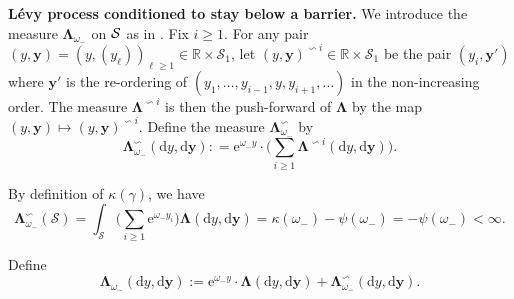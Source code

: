 \documentclass[12pt]{article}
\numberwithin{equation}{section}
\theoremstyle{plain}
\theoremstyle{definition}
\newcommand{\D}{\mathrm{d}}
\begin{document}
\noindent \textbf{L\'evy process conditioned to stay below a barrier. } We introduce the measure $\boldsymbol{\Lambda}_{\omega_-}$ on $\cal{S}$ as in \cite[Section 5.2]{BertoinJean2024SMta}. Fix $i\geq 1$. For any pair $(y, \boldsymbol{y}) = (y, (y_\ell))_{\ell\geq 1}\in\mathbb{R}\times \mathcal{S}_1$, let $(y, \boldsymbol{y})^{\backsim i} \in \mathbb{R}\times \mathcal{S}_1$ be the pair $(y_i, \boldsymbol{y'})$ where $\boldsymbol{y'}$ is the re-ordering of $(y_1, \ldots, y_{i-1}, y, y_{i+1}, \ldots)$ in the non-increasing order. The measure $\boldsymbol{\Lambda}^{\backsim i}$ is then the push-forward of $\boldsymbol{\Lambda}$ by the map $(y, \boldsymbol{y})\mapsto (y, \boldsymbol{y})^{\backsim i}$. Define the measure $\boldsymbol{\Lambda}^{\backsim}_{\omega_-}$ by
\begin{equation}\label{eq: def lambda backsim}
\boldsymbol{\Lambda}^{\backsim}_{\omega_-}(\D y, \D \boldsymbol{y}) : = \mathrm{e}^{\omega_- y}\cdot \bigg(\sum_{i\geq 1}\boldsymbol{\Lambda}^{\backsim i}(\D y, \D \boldsymbol{y})\bigg).
\end{equation}

\noindent By definition of $\kappa(\gamma)$, we have
\begin{equation}\label{eq: finiteness mass}
\boldsymbol{\Lambda}^{\backsim}_{\omega_-}(\mathcal{S}) = \int_{\mathcal{S}}\bigg(\sum_{i\geq 1}\mathrm{e}^{\omega_- y_i}\bigg)\boldsymbol{\Lambda}(\D y, \D \boldsymbol{y}) = \kappa(\omega_-)-\psi(\omega_-) = -\psi(\omega_-)<\infty.
\end{equation}

\noindent Define
\begin{equation}\label{eq: def Lambda_gamma}
\boldsymbol{\Lambda}_{\omega_-}(\D y, \D \boldsymbol{y}) := \mathrm{e}^{\omega_- y}\cdot \boldsymbol{\Lambda}(\D y,\D \boldsymbol{y}) + \boldsymbol{\Lambda}^{\backsim}_{\omega_-}(\D y,\D \boldsymbol{y}).
\end{equation}
\end{document}
